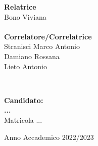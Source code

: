 \begin{titlepage}
{\begin{minipage}[t]{0.47\textwidth}
        {\large{\bf Relatrice}\\
            Bono Viviana}\\
        \vspace{4mm}
        \\
        {\large{\bf Correlatore/Correlatrice}\\
        Stranisci Marco Antonio\\
        Damiano Rossana\\
        Lieto Antonio
        }
    \end{minipage}
    \\
    \null\hfill
    \begin{minipage}[t]{0.40\textwidth}
        \vspace{15mm}
        {\large{\bf Candidato:\\
                ... \\ %
            } \large{Matricola ...}} %
    \end{minipage}
    \vspace{10mm}
    \begin{center}
        {\large{Anno Accademico 2022/2023}}
    \end{center}
	}
\end{titlepage}